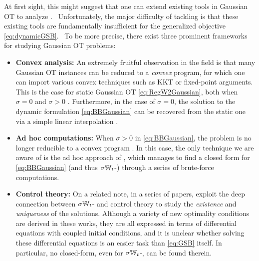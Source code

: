 At first sight, this might suggest that one can extend existing tools in Gaussian \acrshort{OT} to analyze .%
~Unfortunately, the major difficulty of tackling  is that these existing tools are fundamentally insufficient for the generalized objective \eqref{eq:dynamicGSB}. 
~To be more precise, there exist three prominent frameworks for studying Gaussian \acrshort{OT} problems:%
\begin{itemize}[leftmargin=.4cm,itemsep=.0cm,topsep=.0cm]
\item \textbf{Convex analysis:} An extremely fruitful observation in the field is that many Gaussian \acrshort{OT} instances can be reduced to a \emph{convex} program, for which one can import various convex techniques such as \acrfull{KKT} or fixed-point arguments. This is the case for static Gaussian \acrshort{OT} \eqref{eq:RegW2Gaussian}, both when $\sigma = 0$ \citep{dowson1982frechet, olkin1982distance, bhatia2019bures} and $\sigma>0$ \citep{janati2020entropic}. Furthermore, in the case of $\sigma=0$, the solution to the dynamic formulation \eqref{eq:BBGaussian} can be recovered from the static one via a simple linear interpolation \citep{mccann1997convexity}.

\item \textbf{Ad hoc computations:} When $\sigma>0$ in \eqref{eq:BBGaussian}, the problem is no longer reducible to a convex program \citep{leonard2013survey, chen2021stochastic}. In this case, the only technique we are aware of is the ad hoc approach of \citep{mallasto2021entropy}, which manages to find a closed form for \eqref{eq:BBGaussian} (and thus $\sigma\mathbb{W}_{t}$-) through a series of brute-force computations.

\item \textbf{Control theory:} On a related note, in a series of papers, \citet{chen2015optimal,chen2016relation,chen2018optimal} exploit the deep connection between $\sigma\mathbb{W}_{t}$- and control theory to study the \emph{existence} and \emph{uniqueness} of the solutions. Although a variety of new optimality conditions are derived in these works, they are all expressed in terms of differential equations with coupled initial conditions, and it is unclear whether solving these differential equations is an easier task than \eqref{eq:GSB} itself. In particular, no closed-form, even for $\sigma\mathbb{W}_{t}$-, can be found therein. \\
\end{itemize}

